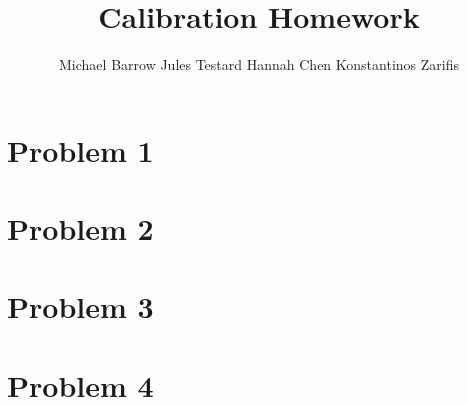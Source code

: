 \documentclass[11pt]{article}
\begin{document}
\title{Calibration Homework}
\author{Michael Barrow \quad Jules Testard \quad Hannah Chen \quad Konstantinos Zarifis}
\maketitle

\section*{Problem 1}



\section*{Problem 2}



\section*{Problem 3}



\section*{Problem 4}


\end{document}
